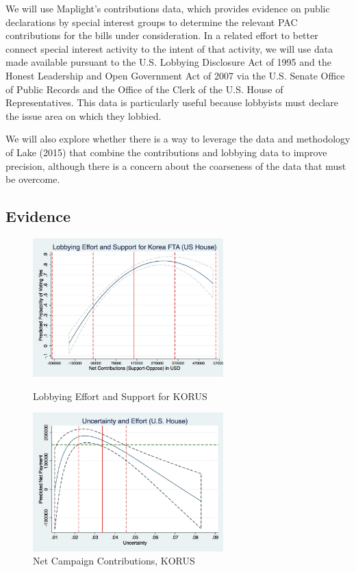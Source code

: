 \documentclass[12pt]{article}
\begin{document}
We will use Maplight's contributions data, which provides evidence on public declarations by special interest groups to determine the relevant PAC contributions for the bills under consideration. In a related effort to better connect special interest activity to the intent of that activity, we will use data made available pursuant to the U.S. Lobbying Disclosure Act of 1995 and the Honest Leadership and Open Government Act of 2007 via the U.S. Senate Office of Public Records and the Office of the Clerk of the U.S. House of Representatives. This data is particularly useful because lobbyists must declare the issue area on which they lobbied.

We will also explore whether there is a way to leverage the data and methodology of Lake (2015) that combine the contributions and lobbying data to improve precision, although there is a concern about the coarseness of the data that must be overcome.

\subsection{Evidence}

\begin{figure}
\centering
\begin{minipage}{.5\textwidth}
  \centering
  \includegraphics[width=2.9in]{graph2.jpg}
  \caption{\small Lobbying Effort and Support for KORUS
	\label{fig:br}}
\end{minipage}%
\begin{minipage}{.5\textwidth}
  \centering
  \includegraphics[width=2.9in]{graph1.jpg}
  \caption{\small Net Campaign Contributions, KORUS
	\label{fig:g1}}
\end{minipage}
\end{figure}
\end{document}
